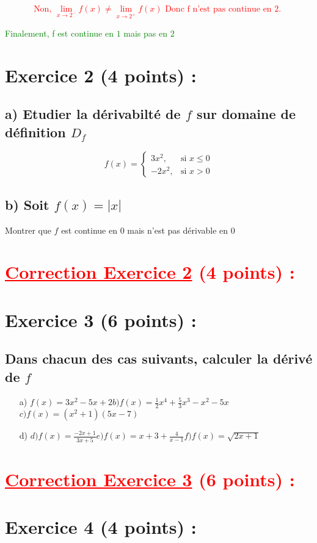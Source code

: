 \documentclass[12pt]{article}
\begin{document}
\textcolor{red}{\[\text{Non, } \lim_{x \to 2^{-}}f(x)\neq\lim_{x \to 2^{+}}f(x)\text{ Donc f n'est pas continue en 2. }\]}

\textcolor{green}{Finalement, f est continue en $1$ mais pas en $2$}
\section*{Exercice 2 (4 points) :}
\subsection*{a) Etudier la dérivabilté de $f$ sur domaine de définition $D_{f}$}
\[ f(x) = \begin{cases} 
  3x^{2}, & \text{si } x \leq 0 \\
  -2x^{2}, & \text{si } x > 0 
\end{cases} \]
\subsection*{b) Soit $f(x)=|x|$ }
Montrer que $f$ est continue en 0 mais n'est pas dérivable en 0
\section*{\textcolor{red}{\underline{Correction Exercice 2} (4 points) :}}
\section*{Exercice 3 (6 points) :}
\subsection*{ Dans chacun des cas suivants, calculer la dérivé de $f$}
\begin{itemize}
\item[a)]$f(x)=3x^{2}-5x+2$\quad\quad $b)f(x)=\frac{1}{2}x^{4}+\frac{5}{3}x^{3}-x^{2}-5x$\quad\quad $c)f(x)=(x^{2}+1)(5x-7)$
\item[d)]$d)f(x)=\frac{-2x+1}{3x+5}$\quad\quad $e)f(x)=x+3+\frac{4}{x-1}$\quad\quad $f)f(x)=\sqrt{2x+1}$
\end{itemize}
\section*{\textcolor{red}{\underline{Correction Exercice 3} (6 points) :}}
\section*{Exercice 4 (4 points) :}
\end{document}
